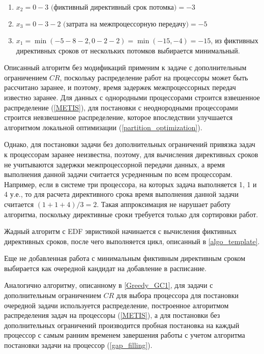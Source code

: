 \begin{enumerate}
    \item $x_2 = 0 - 3 \text{ (фиктивный директивный срок потомка)} = -3$
    \item $x_3 = 0 - 3 - 2 \text{ (затрата на межпроцессорную передачу)} = -5$
    \item $x_1 = \min \left(- 5 - 8 - 2, 0 - 2 - 2\right) = \min \left(-15, -4\right) = -15$, из фиктивных директивных сроков от нескольких потомков выбирается минимальный.
\end{enumerate}

Описанный алгоритм без модификаций применим к задаче с дополнительным ограничением $CR$, поскольку распределение работ на процессоры может быть рассчитано заранее, и поэтому, время задержек межпроцессорных передач известно заранее. Для данных с однородными процессорами строится взвешенное распределение (\ref{METIS}), для постановки с неоднородными процессорами строится невзвешенное распределение, которое впоследствии улучшается алгоритмом локальной оптимизации (\ref{partition_optimization}).

Однако, для постановки задачи без дополнительных ограничений привязка задач к процессорам заранее неизвестна, поэтому, для вычисления директивных сроков не учитываются задержки межпроцессорной передачи данных, а время выполнения данной задачи считается усредненным по всем процессорам. Например, если в системе три процессора, на которых задача выполняется 1, 1 и 4 у.е., то для расчета директивного срока время выполнения данной задачи считается $(1+1+4)/3 = 2$. Такая аппроксимация не нарушает работу алгоритма, поскольку директивные сроки требуется только для сортировки работ.

Жадный алгоритм с EDF эвристикой начинается с вычисления фиктивных директивных сроков, после чего выполняется цикл, описанный в \ref{algo_template}.

Еще не добавленная работа с минимальным фиктивным директивным сроком выбирается как очередной кандидат на добавление в расписание.

Аналогично алгоритму, описанному в \ref{Greedy_GC1}, для задачи с дополнительным ограничением $CR$ для выбора процессора для постановки очередной задачи используется распределение, построенное алгоритмом распределения задач на процессоры (\ref{METIS}), а для постановки без дополнительных ограничений производится пробная постановка на каждый процессор с самым ранним временем завершения работы с учетом алгоритма постановки задачи на процессор (\ref{gap_filling}).

